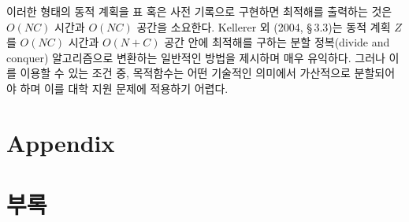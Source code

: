 \documentclass[11pt]{article} %
\theoremstyle{definition}
\theoremstyle{definition}
\begin{document}
이러한 형태의 동적 계획을 표 혹은 사전 기록으로 구현하면 최적해를 출력하는 것은 $O(NC)$ 시간과 $O(NC)$ 공간을 소요한다. Kellerer 외 (2004, \S\,3.3)는 동적 계획 $Z$를 $O(N C)$ 시간과 $O(N + C)$ 공간 안에 최적해를 구하는 분할 정복(divide and conquer) 알고리즘으로 변환하는 일반적인 방법을 제시하며 매우 유익하다. 그러나 이를 이용할 수 있는 조건 중, 목적함수는 어떤 기술적인 의미에서 가산적으로 분할되어야 하며 이를 대학 지원 문제에 적용하기 어렵다.
\fi

\appendix
\ifen \section{Appendix} \else \section{부록} \fi
\end{document}
